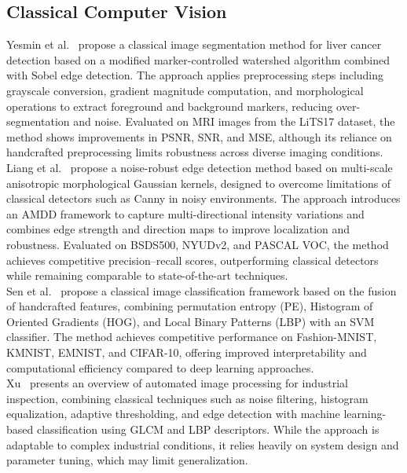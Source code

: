 \documentclass[11pt]{article}
\begin{document}
\subsection{Classical Computer Vision}

Yesmin et al.~\cite{Yesmin2025ModifiedWatershed} propose a classical image
segmentation method for liver cancer detection based on a modified
marker-controlled watershed algorithm combined with Sobel edge detection. The
approach applies preprocessing steps including grayscale conversion, gradient
magnitude computation, and morphological operations to extract foreground and
background markers, reducing over-segmentation and noise. Evaluated on MRI images
from the LiTS17 dataset, the method shows improvements in PSNR, SNR, and MSE,
although its reliance on handcrafted preprocessing limits robustness across
diverse imaging conditions.\\

Liang et al.~\cite{Liang2025} propose a noise-robust edge detection method based
on multi-scale anisotropic morphological Gaussian kernels, designed to overcome
limitations of classical detectors such as Canny in noisy environments. The
approach introduces an AMDD framework to capture multi-directional intensity
variations and combines edge strength and direction maps to improve localization
and robustness. Evaluated on BSDS500, NYUDv2, and PASCAL VOC, the method achieves
competitive precision--recall scores, outperforming classical detectors while
remaining comparable to state-of-the-art techniques.\\

Sen et al.~\cite{Sen2025FeatureEngineering} propose a classical image
classification framework based on the fusion of handcrafted features, combining
permutation entropy (PE), Histogram of Oriented Gradients (HOG), and Local Binary
Patterns (LBP) with an SVM classifier. The method achieves competitive performance
on Fashion-MNIST, KMNIST, EMNIST, and CIFAR-10, offering improved interpretability
and computational efficiency compared to deep learning approaches.\\

Xu~\cite{Xu2025IndustrialInspection} presents an overview of automated image
processing for industrial inspection, combining classical techniques such as noise
filtering, histogram equalization, adaptive thresholding, and edge detection with
machine learning-based classification using GLCM and LBP descriptors. While the
approach is adaptable to complex industrial conditions, it relies heavily on system
design and parameter tuning, which may limit generalization.\\
\end{document}
